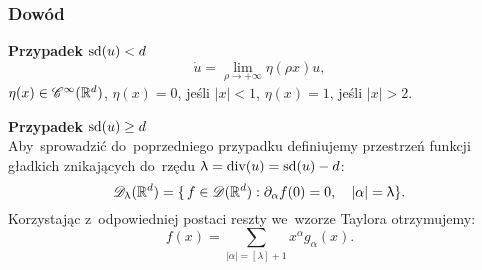 \documentclass[10pt,t]{beamer}
\newcommand{\divDegree}{\textrm{div}}
\begin{document}
\begin{frame}
  \frametitle{Dowód}


  \textbf{Przypadek} $\textrm{sd}( u ) < d$ \\
  \begin{equation}
    \label{eq:Epstein-Glaser-06}
    \dot{ u } = \lim\limits_{ \rho \to +\infty } \eta( \rho x ) u,
  \end{equation}
  $\eta( x ) \in \mathcal{C}^{ \infty }( \mathbb{R}^{ d } )$, $\eta( x ) = 0$, jeśli $| x | < 1$,
  $\eta( x ) = 1$, jeśli $| x | > 2$.

  \vspace{\spaceFour}



  \textbf{Przypadek} $\textrm{sd}( u ) \geq d$ \\
  Aby~sprowadzić do~poprzedniego przypadku definiujemy przestrzeń
  funkcji gładkich znikających do~rzędu
  $\lambda = \divDegree( u ) = \sd( u ) - d$:
  \begin{equation}
    \label{eq:Epstein-Glaser-07}
    \mathcal{D}_{ \uplambda }( \mathbb{R}^{ d } ) =
    \{ \, f \in \mathcal{D}( \mathbb{R}^{ d } ) : \partial_{ \alpha } f( 0 ) = 0, \quad
    | \alpha | = \uplambda \}.
  \end{equation}
  Korzystając z~odpowiedniej postaci reszty we~wzorze Taylora
  otrzymujemy:
  \begin{equation}
    \label{eq:Epstein-Glaser-08}
    f( x ) = \sum_{ | \alpha | = [ \lambda ] + 1 } x^{ \alpha }
    g_{ \alpha }( x ).
  \end{equation}

\end{frame}
\end{document}
